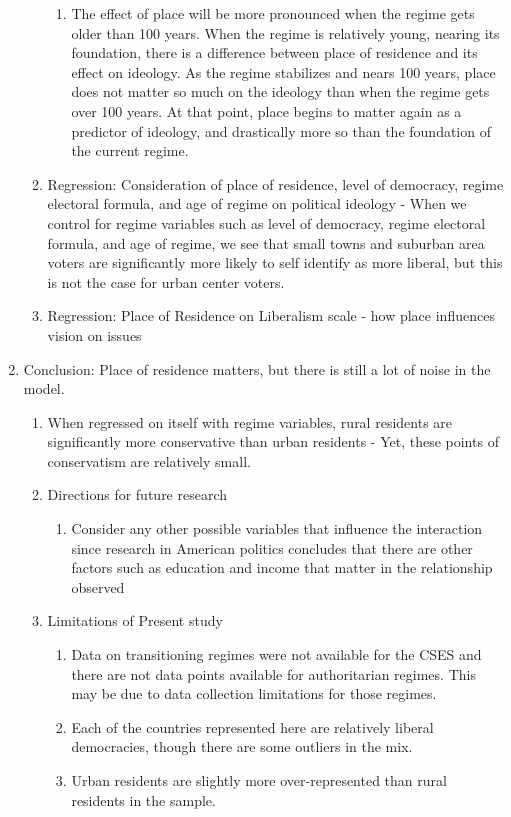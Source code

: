 \documentclass[12pt]{article}
\begin{document}
\begin{enumerate}
\begin{enumerate}
\begin{enumerate}
		\item The effect of place will be more pronounced when the regime gets older than 100 years. When the regime is relatively young, nearing its foundation, there is a difference between place of residence and its effect on ideology. As the regime stabilizes and nears 100 years, place does not matter so much on the ideology than when the regime gets over 100 years. At that point, place begins to matter again as a predictor of ideology, and drastically more so than the foundation of the current regime.
	\end{enumerate}
	\item Regression: Consideration of place of residence, level of democracy, regime electoral formula, and age of regime on political ideology - When we control for regime variables such as level of democracy, regime electoral formula, and age of regime, we see that small towns and suburban area voters are significantly more likely to self identify as more liberal, but this is not the case for urban center voters.
	\item Regression: Place of Residence on Liberalism scale - how place influences vision on issues
\end{enumerate}
\item Conclusion: Place of residence matters, but there is still a lot of noise in the model.
\begin{enumerate}
	\item When regressed on itself with regime variables, rural residents are significantly more conservative than urban residents - Yet, these points of conservatism are relatively small. 
	\item Directions for future research
	\begin{enumerate}
		\item Consider any other possible variables that influence the interaction since research in American politics concludes that there are other factors such as education and income that matter in the relationship observed \citep{gimpel_rural_2006}
	\end{enumerate}
	\item Limitations of Present study
	\begin{enumerate}
		\item Data on transitioning regimes were not available for the CSES and there are not data points available for authoritarian regimes. This may be due to data collection limitations for those regimes. 
		\item Each of the countries represented here are relatively liberal democracies, though there are some outliers in the mix. 
		\item Urban residents are slightly more over-represented than rural residents in the sample.
	\end{enumerate}
\end{enumerate}
\end{enumerate}
\end{document}
